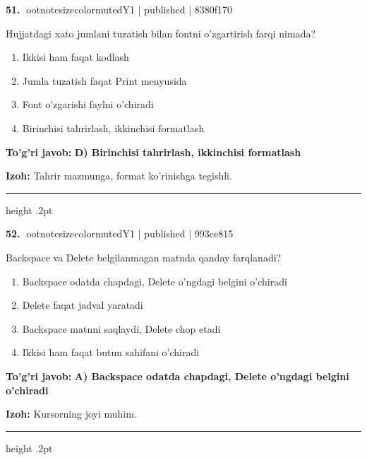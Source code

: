 \documentclass[10pt,a4paper]{article}
\begin{document}
\textbf{\color{ink}51.} {ootnotesizecolor{muted}Y1 | published | 8380f170}
\par
Hujjatdagi xato jumlani tuzatish bilan fontni o'zgartirish farqi nimada?
\begin{enumerate}[label=\Alph*),leftmargin=9mm]
\item Ikkisi ham faqat kodlash
\item Jumla tuzatish faqat Print menyusida
\item Font o'zgarishi faylni o'chiradi
\item Birinchisi tahrirlash, ikkinchisi formatlash
\end{enumerate}
\begin{tcolorbox}[enhanced,breakable,colback=teal!4,colframe=teal!55!black,boxrule=0.45pt,arc=1.2mm,left=2.8mm,right=2.8mm,top=2mm,bottom=2mm]
\textbf{\color{teal}To'g'ri javob:} \textbf{D) Birinchisi tahrirlash, ikkinchisi formatlash}
\par\smallskip
\textbf{Izoh:} Tahrir mazmunga, format ko'rinishga tegishli.
\end{tcolorbox}
\vspace{2mm}\hrule height .2pt\vspace{2mm}

\textbf{\color{ink}52.} {ootnotesizecolor{muted}Y1 | published | 993ce815}
\par
Backspace va Delete belgilanmagan matnda qanday farqlanadi?
\begin{enumerate}[label=\Alph*),leftmargin=9mm]
\item Backspace odatda chapdagi, Delete o'ngdagi belgini o'chiradi
\item Delete faqat jadval yaratadi
\item Backspace matnni saqlaydi, Delete chop etadi
\item Ikkisi ham faqat butun sahifani o'chiradi
\end{enumerate}
\begin{tcolorbox}[enhanced,breakable,colback=teal!4,colframe=teal!55!black,boxrule=0.45pt,arc=1.2mm,left=2.8mm,right=2.8mm,top=2mm,bottom=2mm]
\textbf{\color{teal}To'g'ri javob:} \textbf{A) Backspace odatda chapdagi, Delete o'ngdagi belgini o'chiradi}
\par\smallskip
\textbf{Izoh:} Kursorning joyi muhim.
\end{tcolorbox}
\vspace{2mm}\hrule height .2pt\vspace{2mm}
\end{document}
